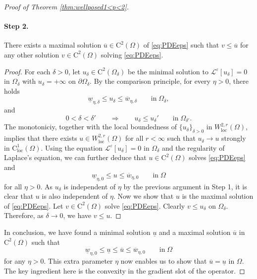 \documentclass[12pt,reqno]{amsart}
\numberwithin{figure}{section}
\theoremstyle{plain}
\theoremstyle{remark}
\numberwithin{equation}{section}
\newcommand{\rmC}{\mathrm{C}}
\begin{document}
\begin{proof} [Proof of Theorem \ref{thm:wellposed1<p<2}]
\paragraph{\textbf{Step 2.}} There exists a maximal solution $\overline{u}\in \mathrm{C}^2(\Omega)$ of \eqref{eq:PDEeps} such that $v\leq \overline{u}$ for any other solution $v\in \mathrm{C}^2(\Omega)$ solving \eqref{eq:PDEeps}.


\begin{proof} For each $\delta>0$, let $u_\delta\in \mathrm{C}^2(\Omega_\delta)$ be the minimal solution to $\mathcal{L}^\varepsilon[u_\delta] = 0$ in $\Omega_\delta$ with $u_\delta = +\infty$ on $\partial\Omega_\delta$. By the comparison principle, for every $\eta>0$, there holds
\begin{equation*}
    \underline{w}_{\eta,\delta} \leq u_\delta \leq \overline{w}_{\eta,\delta} \qquad\text{in}\;\Omega_\delta,
\end{equation*}
and
\begin{equation*}
    0<\delta<\delta' \qquad \Longrightarrow\qquad u_\delta \leq u_\delta' \qquad\text{in}\;\Omega_{\delta'}.
\end{equation*}
The monotoniciy, together with the local boundedness of $\{u_\delta\}_{\delta>0}$ in $W^{2,r}_{\mathrm{loc}}(\Omega)$, implies that there exists $u\in W^{2,r}_{\mathrm{loc}}(\Omega)$ for all $r<\infty$ such that $u_\delta\to u$ strongly in $\rmC^1_{\mathrm{loc}}(\Omega)$. Using the equation $\mathcal{L}^\varepsilon [u_\delta] = 0$ in $\Omega_\delta$ and the regularity of Laplace's equation, we can further deduce that $u\in \mathrm{C}^2(\Omega)$ solves \eqref{eq:PDEeps} and 
\begin{equation*}
    \underline{w}_{\eta,0} \leq u\leq \overline{w}_{\eta,0} \qquad\text{in}\;\Omega
\end{equation*}
for all $\eta>0$. As $u_\delta$ is independent of $\eta$ by the previous argument in Step 1, it is clear that $u$ is also independent of $\eta$. Now we show that $u$ is the maximal solution of \eqref{eq:PDEeps}. Let $v\in\rmC^2(\Omega)$ solve \eqref{eq:PDEeps}. Clearly $v\leq u_\delta$ on $\Omega_\delta$. Therefore, as $\delta \to 0$, we have $v\leq u$.
\end{proof}
\noindent In conclusion, we have found a minimal solution $\underline{u}$ and a maximal solution $\overline{u}$ in $\rmC^2(\Omega)$ such that
\begin{equation}\label{e:chain}
    \underline{w}_{\eta,0} \leq \underline{u}\leq \overline{u}\leq \overline{w}_{\eta,0} \qquad\text{in}\;\Omega
\end{equation}
for any $\eta>0$. This extra parameter $\eta$ now enables us to show that $\overline{u} = \underline{u}$ in $\Omega$. The key ingredient here is the convexity in the gradient slot of the operator.
\smallskip

\end{proof}
\end{document}
